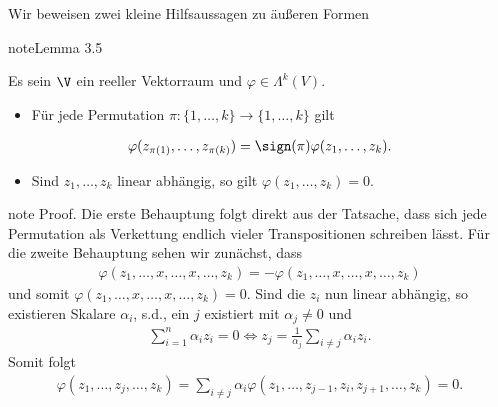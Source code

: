 \documentclass[letterpaper,10pt,english]{jupyterBook}
\begin{document}
\sphinxAtStartPar
Wir beweisen zwei kleine Hilfsaussagen zu äußeren Formen
\label{vektoranalysis/multilinear:lemma-15}
\begin{sphinxadmonition}{note}{Lemma 3.5}



\sphinxAtStartPar
Es sein \(\V\) ein reeller Vektorraum und \(\varphi\in\Lambda^k(V)\).
\begin{itemize}
\item {} 
\sphinxAtStartPar
Für jede Permutation \(\pi:\{1,\ldots,k\}\rightarrow\{1,\ldots,k\}\) gilt

\end{itemize}
\begin{equation*}
\begin{split}\varphi(z_{\pi(1)},\ldots,z_{\pi(k)}) = \sign(\pi) \varphi(z_1,\ldots,z_k).\end{split}
\end{equation*}\begin{itemize}
\item {} 
\sphinxAtStartPar
Sind \(z_1,\ldots, z_k\) linear abhängig, so gilt \(\varphi(z_1,\ldots,z_k) = 0\).

\end{itemize}
\end{sphinxadmonition}

\begin{sphinxadmonition}{note}
\sphinxAtStartPar
Proof. Die erste Behauptung folgt direkt aus der Tatsache, dass sich jede Permutation als Verkettung endlich vieler Transpositionen schreiben lässt.
Für die zweite Behauptung sehen wir zunächst, dass
\begin{equation*}
\begin{split}\varphi(z_1,\ldots,x,\ldots, x,\ldots,z_k) = -\varphi(z_1,\ldots,x,\ldots,x,\ldots,z_k)\end{split}
\end{equation*}
\sphinxAtStartPar
und somit \(\varphi(z_1,\ldots,x,\ldots,x,\ldots,z_k)=0\). Sind die \(z_i\) nun linear abhängig, so existieren Skalare \(\alpha_i\), s.d.,
ein \(j\) existiert mit \(\alpha_j\neq 0\) und
\begin{equation*}
\begin{split}\sum_{i=1}^n \alpha_i z_i = 0 \Leftrightarrow z_j = 
\frac{1}{\alpha_j} \sum_{i\neq j} \alpha_i z_i.\end{split}
\end{equation*}
\sphinxAtStartPar
Somit folgt
\begin{equation*}
\begin{split}\varphi(z_1,\ldots,z_j,\ldots,z_k) = 
\sum_{i\neq j} \alpha_i \varphi(z_1,\ldots,z_{j-1},z_i,z_{j+1},\ldots,z_k) = 0.\end{split}
\end{equation*}\end{sphinxadmonition}
\end{document}
